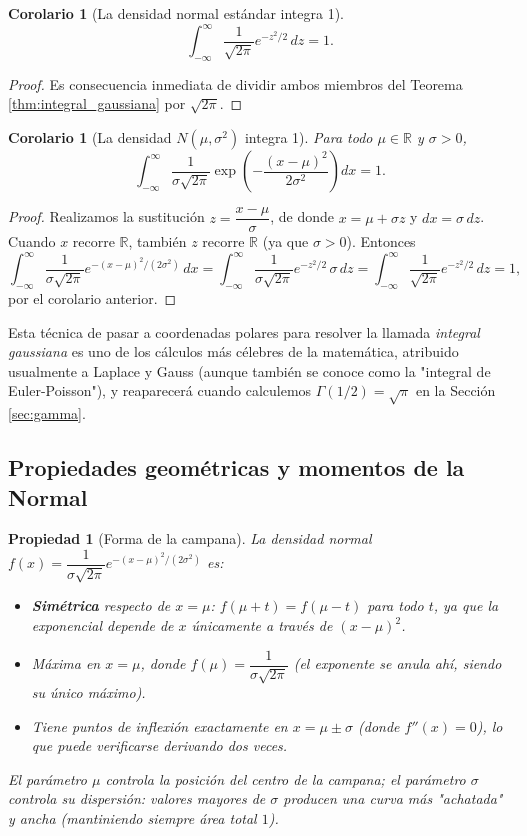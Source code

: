 \documentclass[11pt,a4paper]{article}
\theoremstyle{plain}
\newtheorem{propiedad}[teorema]{Propiedad}
\newtheorem{corolario}[teorema]{Corolario}
\theoremstyle{definition}
\theoremstyle{remark}
\begin{document}
\begin{corolario}[La densidad normal estándar integra 1]
$$\int_{-\infty}^{\infty}\frac{1}{\sqrt{2\pi}}e^{-z^2/2}\,dz=1.$$
\end{corolario}
\begin{proof}
Es consecuencia inmediata de dividir ambos miembros del Teorema \ref{thm:integral_gaussiana} por $\sqrt{2\pi}$.
\end{proof}

\begin{corolario}[La densidad $N(\mu,\sigma^2)$ integra 1]
Para todo $\mu\in\mathbb{R}$ y $\sigma>0$,
$$\int_{-\infty}^{\infty}\frac{1}{\sigma\sqrt{2\pi}}\exp\left(-\frac{(x-\mu)^2}{2\sigma^2}\right)dx=1.$$
\end{corolario}
\begin{proof}
Realizamos la sustitución $z=\dfrac{x-\mu}{\sigma}$, de donde $x=\mu+\sigma z$ y $dx=\sigma\,dz$. Cuando $x$ recorre $\mathbb{R}$, también $z$ recorre $\mathbb{R}$ (ya que $\sigma>0$). Entonces
$$\int_{-\infty}^{\infty}\frac{1}{\sigma\sqrt{2\pi}}e^{-(x-\mu)^2/(2\sigma^2)}\,dx=\int_{-\infty}^{\infty}\frac{1}{\sigma\sqrt{2\pi}}e^{-z^2/2}\,\sigma\,dz=\int_{-\infty}^{\infty}\frac{1}{\sqrt{2\pi}}e^{-z^2/2}\,dz=1,$$
por el corolario anterior.
\end{proof}

Esta técnica de pasar a coordenadas polares para resolver la llamada \emph{integral gaussiana} es uno de los cálculos más célebres de la matemática, atribuido usualmente a Laplace y Gauss (aunque también se conoce como la "integral de Euler-Poisson"), y reaparecerá cuando calculemos $\Gamma(1/2)=\sqrt{\pi}$ en la Sección \ref{sec:gamma}.

\subsection{Propiedades geométricas y momentos de la Normal}

\begin{propiedad}[Forma de la campana]
La densidad normal $f(x)=\dfrac{1}{\sigma\sqrt{2\pi}}e^{-(x-\mu)^2/(2\sigma^2)}$ es:
\begin{itemize}
\item \textbf{Simétrica} respecto de $x=\mu$: $f(\mu+t)=f(\mu-t)$ para todo $t$, ya que la exponencial depende de $x$ únicamente a través de $(x-\mu)^2$.
\item Máxima en $x=\mu$, donde $f(\mu)=\dfrac{1}{\sigma\sqrt{2\pi}}$ (el exponente se anula ahí, siendo su único máximo).
\item Tiene puntos de inflexión exactamente en $x=\mu\pm\sigma$ (donde $f''(x)=0$), lo que puede verificarse derivando dos veces.
\end{itemize}
El parámetro $\mu$ controla la posición del centro de la campana; el parámetro $\sigma$ controla su dispersión: valores mayores de $\sigma$ producen una curva más "achatada" y ancha (mantiniendo siempre área total $1$).
\end{propiedad}
\end{document}
